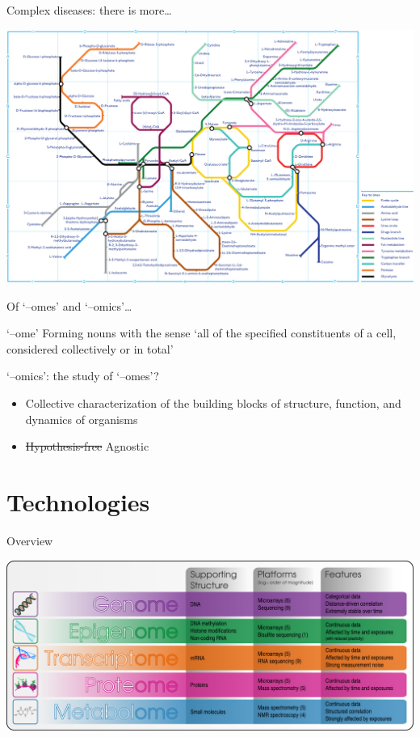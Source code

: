 \begin{frame}{Complex diseases: there is more\ldots}
    \begin{center}
        \includegraphics[height=0.9\textheight]{figures/metabolism}
    \end{center}
\end{frame}

\begin{frame}{Of `--omes' and `--omics'\ldots}
    \begin{block}{`--ome'}
        Forming nouns with the sense `all of the specified constituents of a
        cell, considered collectively or in total'
    \end{block}
    \vfill
    \begin{block}{`--omics': the study of `--omes'?}
        \begin{itemize}
            \item \alert{Collective} characterization of the building blocks of
                  structure, function, and dynamics of organisms
            \item \sout{Hypothesis\hyp{}free} Agnostic
        \end{itemize}
    \end{block}
\end{frame}

\section{Technologies}

\begin{frame}{Overview}
    \begin{center}
        \includegraphics[width=\textwidth]{figures/omics}
    \end{center}
\end{frame}

